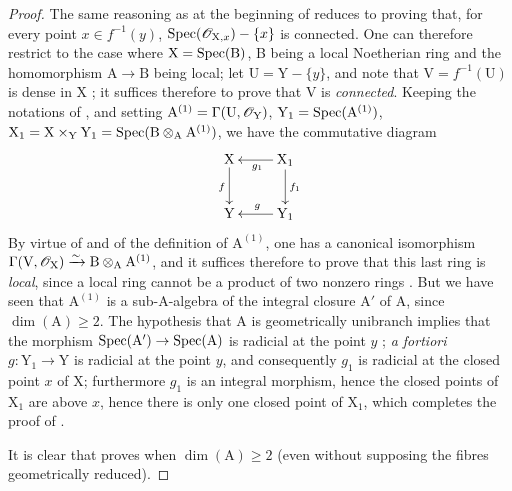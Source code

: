 \begin{proof}
The same reasoning as at the beginning of  reduces to proving that, for every point $x\in f^{-1}(y)$, $\operatorname{Spec}(\mathscr{O}_{\mathrm{X},x})-\{x\}$ is connected.
One can therefore restrict to the case where $\mathrm{X}=\operatorname{Spec}(\mathrm{B})$, B being a local Noetherian ring and the homomorphism $\mathrm{A}\to\mathrm{B}$ being local;
let $\mathrm{U}=\mathrm{Y}-\{y\}$, and note that $\mathrm{V}=f^{-1}(\mathrm{U})$ is dense in X ;
it suffices therefore to prove that V is \emph{connected}.
Keeping the notations of , and setting $\mathrm{A}^{(1)}=\Gamma(\mathrm{U},\mathscr{O}_{\mathrm{Y}})$, $\mathrm{Y}_1=\operatorname{Spec}(\mathrm{A}^{(1)})$, $\mathrm{X}_1=\mathrm{X}\times_{\mathrm{Y}}\mathrm{Y}_1=\operatorname{Spec}(\mathrm{B}\otimes_{\mathrm{A}}\mathrm{A}^{(1)})$, we have the commutative diagram
\[
  \xymatrix{
    \mathrm{X} \ar[d]_{f} & \mathrm{X}_1 \ar[l]^{g_1} \ar[d]^{f_1} \\
    \mathrm{Y} & \mathrm{Y}_1 \ar[l]_{g}
  }
\]
By virtue of  and of the definition of $\mathrm{A}^{(1)}$, one has a canonical isomorphism $\Gamma(\mathrm{V},\mathscr{O}_{\mathrm{X}})\xrightarrow{\sim}\mathrm{B}\otimes_{\mathrm{A}}\mathrm{A}^{(1)}$, and it suffices therefore to prove that this last ring is \emph{local}, since a local ring cannot be a product of two nonzero rings .
But we have seen  that $\mathrm{A}^{(1)}$ is a sub-A-algebra of the integral closure $\mathrm{A}'$ of A, since $\dim(\mathrm{A})\geq 2$.
The hypothesis that A is geometrically unibranch implies that the morphism $\operatorname{Spec}(\mathrm{A}')\to\operatorname{Spec}(\mathrm{A})$ is radicial at the point $y$ ;
\emph{a fortiori} $g:\mathrm{Y}_1\to\mathrm{Y}$ is radicial at the point $y$, and consequently $g_1$ is radicial at the closed point $x$ of X;
furthermore $g_1$ is an integral morphism, hence the closed points of $\mathrm{X}_1$ are above $x$, hence there is only one closed point of $\mathrm{X}_1$, which completes the proof of .

It is clear that  proves  when $\dim(\mathrm{A})\geq 2$ (even without supposing the fibres geometrically reduced).


\end{proof}
